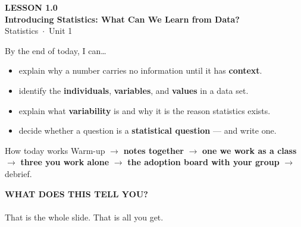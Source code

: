 \documentclass[aspectratio=169, 11pt]{beamer}
\begin{document}
{
\begin{frame}[plain]
  \vspace{2.8cm}\hspace{0.55cm}%
  \begin{minipage}{0.9\textwidth}
    {\color{goldacc}\bfseries\small LESSON 1.0}\\[0.5cm]
    {\color{white}\bfseries\LARGE Introducing Statistics: What Can We Learn from Data?}\\[1.2cm]
    {\color{skymid}\small Statistics~$\cdot$~Unit 1}
  \end{minipage}
\end{frame}
}

\begin{frame}[t, plain]
  By the end of today, I can\ldots
  \begin{itemize}\setlength{\itemsep}{5pt}
    \item explain why a number carries no information until it has \textbf{context}.
    \item identify the \textbf{individuals}, \textbf{variables}, and \textbf{values} in a
          data set.
    \item explain what \textbf{variability} is and why it is the reason statistics exists.
    \item decide whether a question is a \textbf{statistical question} --- and write one.
  \end{itemize}
  \begin{block}{How today works}
    Warm-up $\to$ \textbf{notes together} $\to$ \textbf{one we work as a class} $\to$
    \textbf{three you work alone} $\to$ \textbf{the adoption board with your group} $\to$
    debrief.
  \end{block}
\end{frame}

{
\begin{frame}[plain]
  \vspace{1.6cm}
  \begin{center}
    {\color{skymid}\bfseries\small WHAT DOES THIS TELL YOU?}\\[1.0cm]
    {\color{white}\bfseries\fontsize{72}{72}}\\[1.2cm]
    {\color{goldacc}\small That is the whole slide. That is all you get.}
  \end{center}
\end{frame}
}
\end{document}
